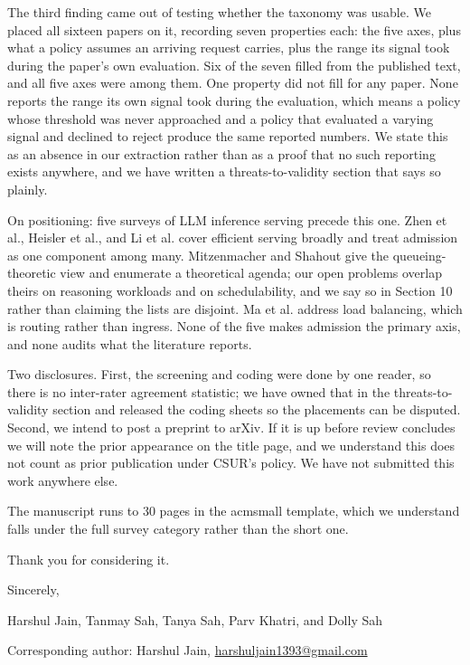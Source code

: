 \documentclass[10pt]{article}
\begin{document}
The third finding came out of testing whether the taxonomy was usable. We placed
all sixteen papers on it, recording seven properties each: the five axes, plus
what a policy assumes an arriving request carries, plus the range its signal
took during the paper's own evaluation. Six of the seven filled from the
published text, and all five axes were among them. One property did not fill for
any paper. None reports the range its own signal took during the evaluation,
which means a policy whose threshold was never approached and a policy that
evaluated a varying signal and declined to reject produce the same reported
numbers. We state this as an absence in our extraction rather than as a proof
that no such reporting exists anywhere, and we have written a
threats-to-validity section that says so plainly.

On positioning: five surveys of LLM inference serving precede this one. Zhen et
al., Heisler et al., and Li et al. cover efficient serving broadly and treat
admission as one component among many. Mitzenmacher and Shahout give the
queueing-theoretic view and enumerate a theoretical agenda; our open problems
overlap theirs on reasoning workloads and on schedulability, and we say so in
Section 10 rather than claiming the lists are disjoint. Ma et al. address load
balancing, which is routing rather than ingress. None of the five makes
admission the primary axis, and none audits what the literature reports.

Two disclosures. First, the screening and coding were done by one reader, so
there is no inter-rater agreement statistic; we have owned that in the
threats-to-validity section and released the coding sheets so the placements can
be disputed. Second, we intend to post a preprint to arXiv. If it is up before
review concludes we will note the prior appearance on the title page, and we
understand this does not count as prior publication under CSUR's policy. We have
not submitted this work anywhere else.

The manuscript runs to 30 pages in the acmsmall template, which we understand
falls under the full survey category rather than the short one.

Thank you for considering it.

\vspace{0.9em}

\noindent
Sincerely,

\vspace{0.5em}

\noindent
Harshul Jain, Tanmay Sah, Tanya Sah, Parv Khatri, and Dolly Sah

\vspace{0.3em}
\noindent
Corresponding author: Harshul Jain, \href{mailto:harshuljain1393@gmail.com}{harshuljain1393@gmail.com}
\end{document}
